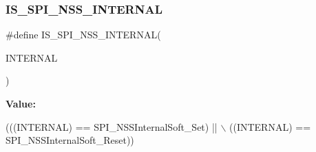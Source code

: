 \subsubsection{\texorpdfstring{I\+S\+\_\+\+S\+P\+I\+\_\+\+N\+S\+S\+\_\+\+I\+N\+T\+E\+R\+N\+AL}{IS\_SPI\_NSS\_INTERNAL}}
{\footnotesize\ttfamily \#define I\+S\+\_\+\+S\+P\+I\+\_\+\+N\+S\+S\+\_\+\+I\+N\+T\+E\+R\+N\+AL(\begin{DoxyParamCaption}\item[{}]{I\+N\+T\+E\+R\+N\+AL }\end{DoxyParamCaption})}

{\bfseries Value\+:}
\begin{DoxyCode}
(((INTERNAL) == SPI\_NSSInternalSoft\_Set) || \(\backslash\)
                                       ((INTERNAL) == SPI\_NSSInternalSoft\_Reset))
\end{DoxyCode}
